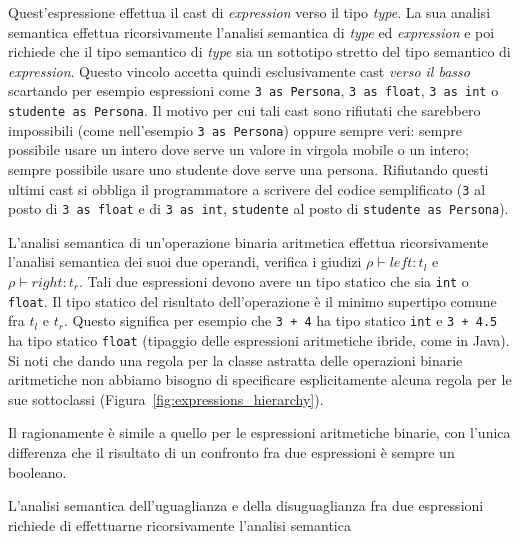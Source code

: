 \begin{description}
  Quest'espressione effettua il cast di \textit{expression} verso il tipo
  \textit{type}. La sua analisi semantica effettua ricorsivamente
  l'analisi semantica di \textit{type} ed \textit{expression} e poi richiede
  che il tipo semantico di \textit{type} sia un sottotipo
  stretto del tipo semantico di \textit{expression}.
  Questo vincolo accetta quindi esclusivamente cast \emph{verso il basso}
  scartando per esempio espressioni come
  \texttt{3 as Persona}, \texttt{3 as float}, \texttt{3 as int} o
  \texttt{studente as Persona}. Il motivo per cui tali cast sono rifiutati
  \e che sarebbero impossibili (come nell'esempio \texttt{3 as Persona})
  oppure sempre veri: \e sempre possibile usare un intero dove serve
  un valore in virgola mobile o un intero; \e sempre possibile usare uno
  studente dove serve una persona. Rifiutando questi ultimi cast si obbliga il
  programmatore a scrivere del codice \piu semplificato
  (\texttt{3} al posto di \texttt{3 as float} e di \texttt{3 as int},
  \texttt{studente} al posto di \texttt{studente as Persona}).
\item[\underline{$\mathtt{ArithmeticBinOp(\mathit{left},\mathit{right})}$}.]
  L'analisi semantica di un'operazione binaria aritmetica effettua
  ricorsivamente l'analisi semantica dei suoi due operandi, \cioe verifica
  i giudizi $\rho\vdash\mathit{left}:t_l$ e $\rho\vdash\mathit{right}:t_r$.
  Tali due espressioni devono avere un tipo statico che sia
  \texttt{int} o \texttt{float}. Il tipo statico del risultato dell'operazione
  \`e il minimo supertipo comune fra $t_l$ e $t_r$. Questo significa per
  esempio che \texttt{3 + 4} ha tipo statico \texttt{int} e
  \texttt{3 + 4.5} ha tipo statico \texttt{float} (tipaggio delle espressioni
  aritmetiche ibride, come in Java).
  Si noti che dando una regola per la classe astratta
  delle operazioni binarie aritmetiche
  non abbiamo bisogno di specificare esplicitamente alcuna regola
  per le sue sottoclassi (Figura~\ref{fig:expressions_hierarchy}).
\item[\underline{$\mathtt{NumericalComparisonBinOp
      (\mathit{left},\mathit{right})}$}.]
  Il ragionamente \`e simile a quello per le espressioni aritmetiche binarie,
  con l'unica differenza che il risultato di un confronto fra due espressioni
  \`e sempre un booleano.
\item[\underline{$\mathtt{Equal(\mathit{left},\mathit{right})}$} e
      \underline{$\mathtt{NotEqual(\mathit{left},\mathit{right})}$}.]
  L'analisi semantica dell'uguaglianza e della disuguaglianza fra due
  espressioni richiede di effettuarne ricorsivamente l'analisi semantica

\end{description}
